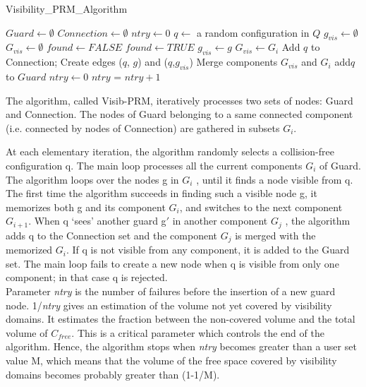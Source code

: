 \documentclass[11pt]{article}
\begin{document}
\begin{algorithm} 
\caption{Visibility\_PRM\_Algorithm} 
\label{alg:prm_alg} 
  \begin{algorithmic}[1]

    \STATE $Guard \leftarrow \emptyset$ 
    \STATE $Connection \leftarrow \emptyset$
    \STATE $ntry \leftarrow 0$
    \STATE $q \leftarrow$ a random configuration in $Q$     
    \STATE $g_{vis} \leftarrow \emptyset$
    \STATE $G_{vis} \leftarrow \emptyset$
        \REPEAT
        \STATE $found \leftarrow FALSE$
                \STATE $found \leftarrow TRUE$
              \ENDIF
                  \STATE $g_{vis} \leftarrow g$
                  \STATE $G_{vis} \leftarrow G_{i}$
              \ENDIF
              \ELSE
                  \STATE Add $q$ to Connection;
                  \STATE Create edges ($q$, $g$) and ($q$,$g_{vis}$)
                  \STATE Merge components $G_{vis}$ and $G_{i}$
          \ENDFOR
              \STATE add{$q$} to $Guard$
              \STATE $ntry \leftarrow 0$
          \ENDIF
          \ELSE
              \STATE $ntry$ = $ntry+1$
      \ENDFOR
  \ENDWHILE
    \end{algorithmic}
\end{algorithm}


The algorithm, called Visib-PRM, iteratively processes two sets of nodes: Guard
and Connection. The nodes of Guard belonging to a same connected component
(i.e. connected by nodes of Connection) are gathered in subsets $G_i$.


At each elementary iteration, the algorithm randomly selects a collision-free
configuration q. The main loop processes all the current components $G_i$ of Guard. The algorithm loops over the nodes g in $G_i$ , until it finds a node visible from q. The
first time the algorithm succeeds in finding such a visible node g, it memorizes both
g and its component $G_i$, and switches to the next component $G_{i+1}$. When q ‘sees’
another guard g$'$ in another component $G_j$ , the algorithm adds q to the Connection
set and the component $G_j$ is merged with the memorized $G_i$. If q is not visible from
any component, it is added to the Guard set. The main loop fails to create a new
node when q is visible from only one component; in that case q is rejected.\\
Parameter \textit{ntry} is the number of failures before the insertion of a new guard node.
1/\textit{ntry} gives an estimation of the volume not yet covered by visibility domains.
It estimates the fraction between the non-covered volume and the total volume of
$C_{free}$. This is a critical parameter which controls the end of the algorithm. Hence,
the algorithm stops when \textit{ntry} becomes greater than a user set value M, which
means that the volume of the free space covered by visibility domains becomes
probably greater than (1-1/M).
\end{document}

